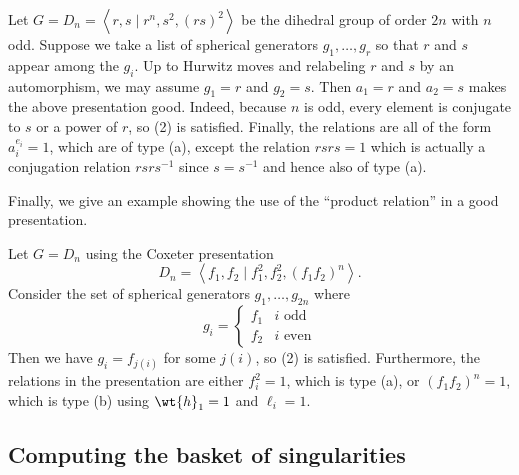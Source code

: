 \documentclass[main.tex]{subfiles}
\begin{document}
\begin{example} \label{example:odd_dihedral}
Let $G = D_{n} = \left< r,s \mid r^n, s^2, (rs)^2 \right>$ be the dihedral group of order $2n$ with $n$ odd. Suppose we take a list of spherical generators $g_1, \dots, g_r$ so that $r$ and $s$ appear among the $g_i$. Up to Hurwitz moves and relabeling $r$ and $s$ by an automorphism, we may assume $g_1 = r$ and $g_2 = s$. Then $a_1 = r$ and $a_2 = s$ makes the above presentation good. 
Indeed, because $n$ is odd, every element is conjugate to $s$ or a power of $r$, so (2) is satisfied. Finally, the relations are all of the form $a_i^{e_i} = 1$, which are of type (a), except the relation $rsrs = 1$ which is actually a conjugation relation $r s r s^{-1}$ since $s = s^{-1}$ and hence also of type (a). 
\end{example}

Finally, we give an example showing the use of the ``product relation'' in a good presentation.

\begin{example} \label{example:reflection_dihedral}
Let $G = D_{n}$ using the Coxeter presentation 
\[ D_{n} = \left< f_1, f_2 \mid f_1^2, f_2^2, (f_1 f_2)^n \right>. \] 
Consider the set of spherical generators $g_1, \dots, g_{2n}$ where 
\[ g_i = 
\begin{cases}
f_1 & i \text{ odd}
\\
f_2 & i \text{ even}
\end{cases}
\]
Then we have $g_i = f_{j(i)}$ for some $j(i)$, so (2) is satisfied. Furthermore, the relations in the presentation are either $f_i^2 = 1$, which is type (a), or $(f_1 f_2)^n = 1$, which is type (b) using $\wt{h}_1 = 1$ and $\ell_i = 1$.
\end{example}

\subsection{Computing the basket of singularities} \label{section:basket}
\end{document}
